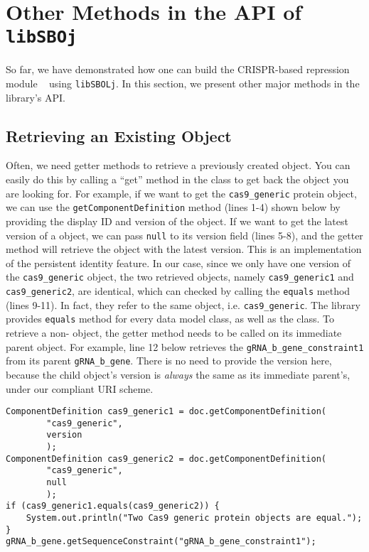 \section*{Other Methods in the API of {\tt libSBOj}}
So far, we have demonstrated how one can build the CRISPR-based repression module ~\cite{kiani2014crispr} using {\tt libSBOLj}. In this section, we present other major methods in the library's API. 

\subsection*{Retrieving an Existing Object}
Often, we need getter methods to retrieve a previously created object. You can easily do this by calling a ``get'' method in the  class to get back the  object you are looking for. For example, if we want to get the \lstinline+cas9_generic+ protein  object, we can use the \lstinline+getComponentDefinition+ method (lines 1-4) shown below by providing the display ID and version of the object. If we want to get the latest version of a  object, we can pass \lstinline+null+ to its version field (lines 5-8), and the getter method will retrieve the object with the latest version. This is an implementation of the persistent identity feature. In our case, since we only have one version of the \lstinline+cas9_generic+ object, the two retrieved objects, namely \lstinline+cas9_generic1+ and \lstinline+cas9_generic2+, are identical, which can checked by calling the \lstinline+equals+ method (lines 9-11). In fact, they refer to the same object, i.e. \lstinline+cas9_generic+. The library provides \lstinline+equals+  method for every data model class, as well as the  class. To retrieve a non- object, the getter method needs to be called on its immediate parent object. For example, line 12 below retrieves the \lstinline+gRNA_b_gene_constraint1+ from its parent  \lstinline+gRNA_b_gene+. There is no need to provide the version here, because the child object's version is \emph{always} the same as its immediate parent's, under our compliant URI scheme.

\vspace{\abovedisplayskip}
\begin{minipage}{0.95\textwidth} 
\begin{lstlisting}
ComponentDefinition cas9_generic1 = doc.getComponentDefinition(
        "cas9_generic", 
        version
        );
ComponentDefinition cas9_generic2 = doc.getComponentDefinition(
        "cas9_generic", 
        null
        );
if (cas9_generic1.equals(cas9_generic2)) {
    System.out.println("Two Cas9 generic protein objects are equal.");
}
gRNA_b_gene.getSequenceConstraint("gRNA_b_gene_constraint1");
\end{lstlisting}
\end{minipage}

